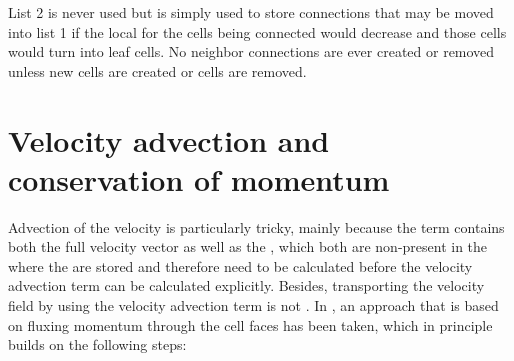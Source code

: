 List 2 is never used but is simply used to store connections that may be moved into list 1 if the local \LOD for the cells being connected would decrease and those cells would turn into leaf cells. No neighbor connections are ever created or removed unless new cells are created or cells are removed.

\section{Velocity advection and conservation of momentum}

Advection of the velocity is particularly tricky, mainly because the  term contains both the full velocity vector as well as the , which both are non-present in the  where the  are stored and therefore need to be calculated before the velocity advection term can be calculated explicitly. Besides, transporting the velocity field by using the velocity advection term is not . In \thisprojectwork, an approach that is based on fluxing momentum through the cell faces has been taken, which in principle builds on the following steps:

